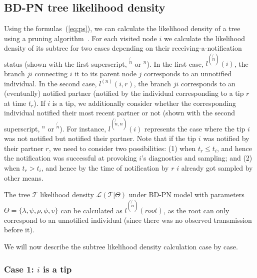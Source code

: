 \documentclass[a4paper,10pt]{article}
\begin{document}
\subsection{BD-PN tree likelihood density} 

Using the formulas~(\ref{eq:ps}), we can calculate the likelihood density of a tree using a pruning algorithm~\citep{10.1093/sysbio/22.3.240}. For each visited node $i$ we calculate the likelihood density of its subtree for two cases depending on their receiving-a-notification status (shown with the first superscript, $^{\not{n}}$ or $^n$). In the first case,  $l^{(\not{n})}(i)$, the branch $ji$ connecting $i$ it to its parent node $j$ corresponds to an unnotified individual. In the second case, $l^{(n)}(i, r)$, the branch $ji$ corresponds to an (eventually) notified partner (notified by the individual corresponding to a tip $r$ at time $t_r$). If $i$ is a tip, we additionally consider whether the corresponding individual notified their most recent partner or not (shown with the second superscript, $^n$ or $^{\not{n}}$). For instance, $l^{(\not{n},n)}(i)$ represents the case where the tip $i$ was not notified but notified their partner. Note that if the tip $i$ was notified by their partner $r$, we need to consider two possibilities: (1) when $t_r \leq t_i$, and hence the notification was successful at provoking $i$'s diagnostics and sampling; and (2) when $t_r > t_i$, and hence by the time of notification by $r$ $i$ already got sampled by other means.

The tree $\mathscr{T}$ likelihood density $\mathscr{L}(\mathscr{T}|\Theta)$ under BD-PN model with parameters $\Theta=\{\lambda, \psi, \rho, \phi, \upsilon\}$ can be calculated as $l^{(\not{n})}(root)$, as the root can only correspond to an unnotified individual (since there was no observed transmission before it).

We will now describe the subtree likelihood density calculation case by case.

\subsubsection*{Case 1: $i$ is a tip} 
\end{document}
